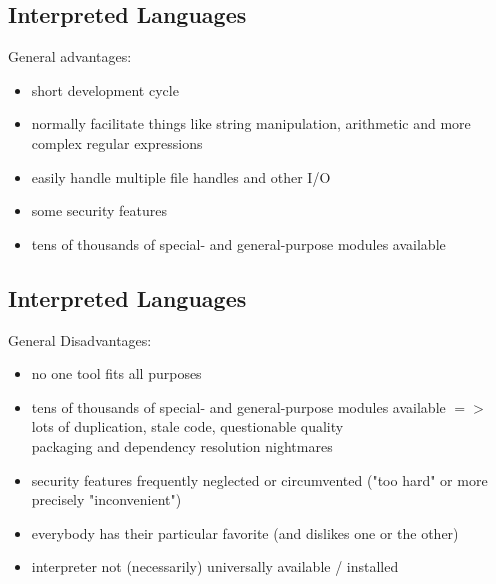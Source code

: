\documentclass[xga]{xdvislides}
\begin{document}
\subsection{Interpreted Languages}
General advantages: \\

\begin{itemize}
	\item short development cycle
	\item normally facilitate things like string manipulation, arithmetic and
		more complex regular expressions
	\item easily handle multiple file handles and other I/O
	\item some security features
	\item tens of thousands of special- and general-purpose modules available
\end{itemize}

\subsection{Interpreted Languages}
General Disadvantages: \\

\begin{itemize}
	\item no one tool fits all purposes
	\item tens of thousands of special- and general-purpose modules available $=>$
		lots of duplication, stale code, questionable quality \\
		packaging and dependency resolution nightmares
	\item security features frequently neglected or circumvented ("too hard" or
		more precisely "inconvenient")
	\item everybody has their particular favorite (and dislikes one or the
		other)
	\item interpreter not (necessarily) universally available / installed
\end{itemize}
\end{document}
